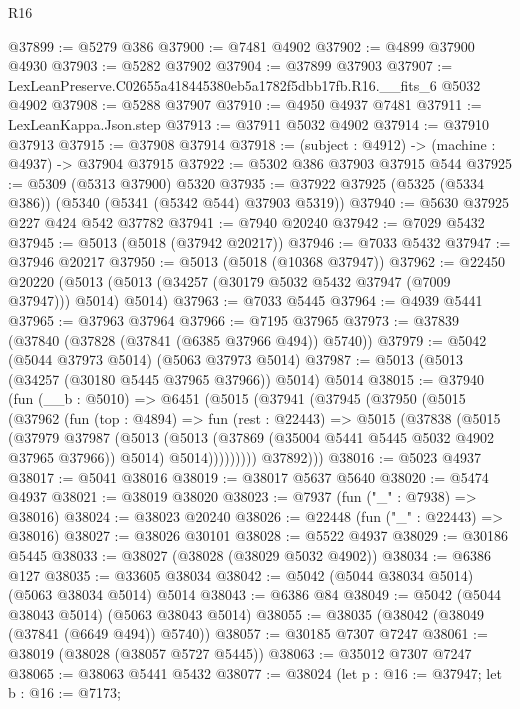 \begin{lexlean}{R16}
\begin{coremodule}
@37899 := @5279 @386
@37900 := @7481 @4902
@37902 := @4899 @37900 @4930
@37903 := @5282 @37902
@37904 := @37899 @37903
@37907 := LexLeanPreserve.C02655a418445380eb5a1782f5dbb17fb.R16.__fits_6 @5032 @4902
@37908 := @5288 @37907
@37910 := @4950 @4937 @7481
@37911 := LexLeanKappa.Json.step
@37913 := @37911 @5032 @4902
@37914 := @37910 @37913
@37915 := @37908 @37914
@37918 := (subject : @4912) -> (machine : @4937) -> @37904 @37915
@37922 := @5302 @386 @37903 @37915 @544
@37925 := @5309 (@5313 @37900) @5320
@37935 := @37922 @37925 (@5325 (@5334 @386)) (@5340 (@5341 (@5342 @544) @37903 @5319))
@37940 := @5630 @37925 @227 @424 @542 @37782
@37941 := @7940 @20240
@37942 := @7029 @5432
@37945 := @5013 (@5018 (@37942 @20217))
@37946 := @7033 @5432
@37947 := @37946 @20217
@37950 := @5013 (@5018 (@10368 @37947))
@37962 := @22450
    @20220
    (@5013 (@5013 (@34257 (@30179 @5032 @5432 @37947 (@7009 @37947))) @5014) @5014)
@37963 := @7033 @5445
@37964 := @4939 @5441
@37965 := @37963 @37964
@37966 := @7195 @37965
@37973 := @37839 (@37840 (@37828 (@37841 (@6385 @37966 @494)) @5740))
@37979 := @5042 (@5044 @37973 @5014) (@5063 @37973 @5014)
@37987 := @5013 (@5013 (@34257 (@30180 @5445 @37965 @37966)) @5014) @5014
@38015 := @37940
    (fun (__b : @5010) =>
    @6451
      (@5015
        (@37941
          (@37945
            (@37950
              (@5015
                (@37962
                  (fun (top : @4894) =>
                  fun (rest : @22443) =>
                  @5015
                    (@37838
                      (@5015
                        (@37979
                          @37987
                          (@5013
                            (@5013 (@37869 (@35004 @5441 @5445 @5032 @4902 @37965 @37966)) @5014)
                            @5014)))))))))
          @37892)))
@38016 := @5023 @4937
@38017 := @5041 @38016
@38019 := @38017 @5637 @5640
@38020 := @5474 @4937
@38021 := @38019 @38020
@38023 := @7937 (fun ("_" : @7938) => @38016)
@38024 := @38023 @20240
@38026 := @22448 (fun ("_" : @22443) => @38016)
@38027 := @38026 @30101
@38028 := @5522 @4937
@38029 := @30186 @5445
@38033 := @38027 (@38028 (@38029 @5032 @4902))
@38034 := @6386 @127
@38035 := @33605 @38034
@38042 := @5042 (@5044 @38034 @5014) (@5063 @38034 @5014) @5014
@38043 := @6386 @84
@38049 := @5042 (@5044 @38043 @5014) (@5063 @38043 @5014)
@38055 := @38035 (@38042 (@38049 (@37841 (@6649 @494)) @5740))
@38057 := @30185 @7307 @7247
@38061 := @38019 (@38028 (@38057 @5727 @5445))
@38063 := @35012 @7307 @7247
@38065 := @38063 @5441 @5432
@38077 := @38024
    (let p : @16 := @37947;
    let b : @16 := @7173;

\end{coremodule}
\end{lexlean}
